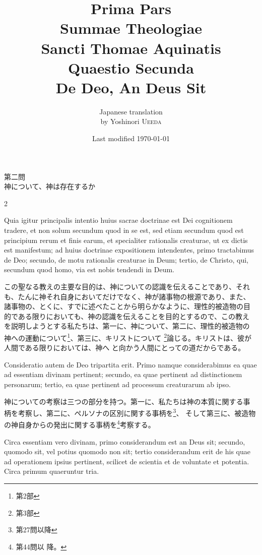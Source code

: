 \documentclass[paper=a4paper,fontsize=10pt,jafontsize=9pt,titlepage]{jlreq}
\title{{\bfseries Prima Pars}\\{\Huge Summae Theologiae}\\Sancti Thomae
Aquinatis\\Quaestio Secunda\\{\bfseries De Deo, An Deus Sit}}
\author{Japanese translation\\by Yoshinori {\scshape Ueeda}}
\date{Last modified \today}
\begin{document}
\maketitle
\begin{center}
 {\Large 第二問\\神について、神は存在するか}
\end{center}

\begin{paracol}{2}

Quia igitur principalis intentio huius sacrae doctrinae est Dei
cognitionem tradere, et non solum secundum quod in se est, sed etiam
secundum quod est principium rerum et finis earum, et specialiter
rationalis creaturae, ut ex dictis est manifestum; ad huius doctrinae
expositionem intendentes, primo tractabimus de Deo; secundo, de motu
rationalis creaturae in Deum; tertio, de Christo, qui, secundum quod
homo, via est nobis tendendi in Deum.

\switchcolumn

この聖なる教えの主要な目的は、神についての認識を伝えることであり、それ
も、たんに神それ自身においてだけでなく、神が諸事物の根源であり、また、
諸事物の、とくに、すでに述べたことから明らかなように、理性的被造物の目
的である限りにおいても、神の認識を伝えることを目的とするので、この教え
を説明しようとする私たちは、第一に、神について、第二に、理性的被造物の
神への運動について\footnote{第2部}、第三に、キリストについて
\footnote{第3部}論じる。キリストは、彼が人間である限りにおいては、神へ
と向かう人間にとっての道だからである。

\switchcolumn*

Consideratio autem de Deo tripartita erit. Primo namque considerabimus
ea quae ad essentiam divinam pertinent; secundo, ea quae pertinent ad
distinctionem personarum; tertio, ea quae pertinent ad processum
creaturarum ab ipso.

\switchcolumn

神についての考察は三つの部分を持つ。第一に、私たちは神の本質に関する事
柄を考察し、第二に、ペルソナの区別に関する事柄を\footnote{第27問以降}、
そして第三に、被造物の神自身からの発出に関する事柄を\footnote{第44問以
降。}考察する。

\switchcolumn*

Circa essentiam vero divinam, primo considerandum est an Deus sit;
secundo, quomodo sit, vel potius quomodo non sit; tertio considerandum
erit de his quae ad operationem ipsius pertinent, scilicet de scientia
et de voluntate et potentia. Circa primum quaeruntur tria.


\end{paracol}
\end{document}
